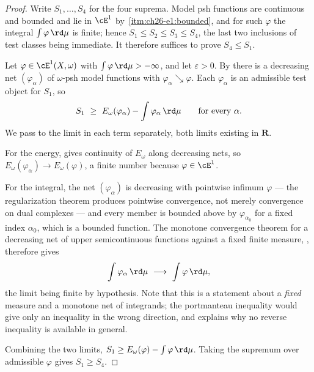 \begin{proof}
Write $S_1,\ldots,S_4$ for the four suprema.  Model psh functions are
continuous and bounded and lie in $\cE^1$ by
\,\cref{itm:ch26-e1:bounded}, and for such
$\varphi$ the integral $\int\varphi\,\rd\mu$ is finite; hence
$S_1\leq S_2\leq S_3\leq S_4$, the last two inclusions of test classes
being immediate.  It therefore suffices to prove $S_4\leq S_1$.

Let $\varphi\in\cE^1(X,\omega)$ with $\int\varphi\,\rd\mu>-\infty$, and
let $\varepsilon>0$.  By  there is
a decreasing net $(\varphi_\alpha)$ of $\omega$-psh model functions with
$\varphi_\alpha\searrow\varphi$.  Each $\varphi_\alpha$ is an admissible
test object for $S_1$, so
\[
 S_1\ \geq\ E_\omega(\varphi_\alpha)-\int\varphi_\alpha\,\rd\mu
 \qquad\text{for every }\alpha .
\]
We pass to the limit in each term separately, both limits existing in
$\mathbf R$.

For the energy,  gives continuity of
$E_\omega$ along decreasing nets, so
$E_\omega(\varphi_\alpha)\to E_\omega(\varphi)$, a finite number because
$\varphi\in\cE^1$.

For the integral, the net $(\varphi_\alpha)$ is decreasing with pointwise
infimum $\varphi$ --- the regularization theorem produces pointwise
convergence, not merely convergence on dual complexes --- and every member
is bounded above by $\varphi_{\alpha_0}$ for a fixed index
$\alpha_0$, which is a bounded function.  The monotone convergence theorem
for a decreasing net of upper semicontinuous functions against a fixed finite
measure, , therefore gives
\[
 \int\varphi_\alpha\,\rd\mu\ \longrightarrow\ \int\varphi\,\rd\mu ,
\]
the limit being finite by hypothesis.  Note that this is a statement about a
\emph{fixed} measure and a monotone net of integrands; the portmanteau
inequality  would give only an inequality in the
wrong direction, and  explains why no
reverse inequality is available in general.

Combining the two limits, $S_1\geq E_\omega(\varphi)-\int\varphi\,\rd\mu$.
Taking the supremum over admissible $\varphi$ gives $S_1\geq S_4$.
\end{proof}

